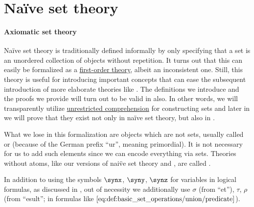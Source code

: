 \section{Na\"ive set theory}\label{sec:naive_set_theory}

\paragraph{Axiomatic set theory}

Na\"ive set theory is traditionally defined informally by only specifying that a set is an unordered collection of objects without repetition. It turns out that this can easily be formalized as a \hyperref[def:first_order_theory]{first-order theory}, albeit an inconsistent one. Still, this theory is useful for introducing important concepts that can ease the subsequent introduction of more elaborate theories like \hyperref[def:zfc]{}. The definitions we introduce and the proofs we provide will turn out to be valid in  also. In other words, we will transparently utilize \hyperref[def:naive_set_theory/unrestricted_comprehension]{unrestricted comprehension} for constructing sets and later in  we will prove that they exist not only in na\"ive set theory, but also in .

\begin{remark}\label{rem:pure_set_theory}
  What we lose in this formalization are objects which are not sets, usually called  or  (because of the German prefix \enquote{ur}, meaning primordial). It is not necessary for us to add such elements since we can encode everything via sets. Theories without atoms, like our versions of nai\"ve set theory and \hyperref[def:axiom_of_universes]{}, are called .
\end{remark}

\begin{remark}\label{rem:set_theory_formula_variables}
  In addition to using the symbols \( \synx \), \( \syny \), \( \synz \) for variables in logical formulas, as discussed in , out of necessity we additionally use \( \sigma \) (from \enquote{et}), \( \tau \), \( \rho \) (from \enquote{esult}; in formulas like \( \ref{eq:def:basic_set_operations/union/predicate} \)).
\end{remark}

